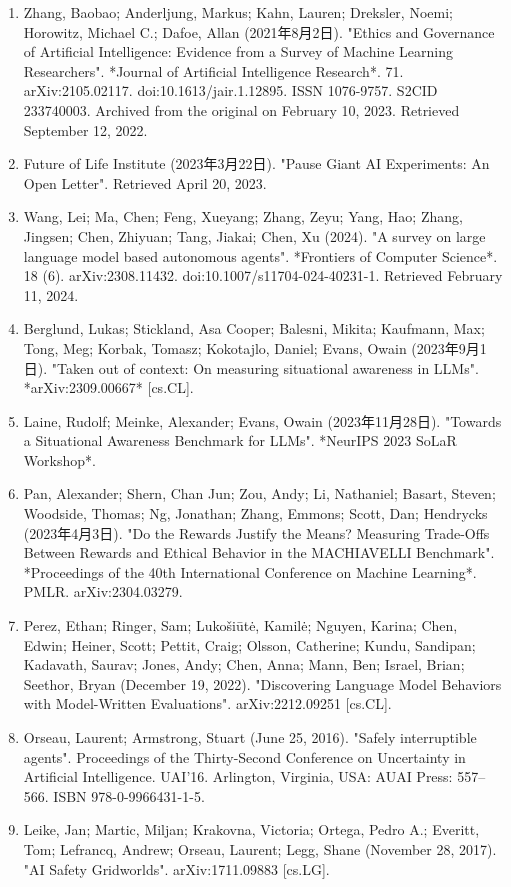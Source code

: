 \begin{enumerate}
\item Zhang, Baobao; Anderljung, Markus; Kahn, Lauren; Dreksler, Noemi; Horowitz, Michael C.; Dafoe, Allan (2021年8月2日). "Ethics and Governance of Artificial Intelligence: Evidence from a Survey of Machine Learning Researchers". *Journal of Artificial Intelligence Research*. 71. arXiv:2105.02117. doi:10.1613/jair.1.12895. ISSN 1076-9757. S2CID 233740003. Archived from the original on February 10, 2023. Retrieved September 12, 2022.
\item Future of Life Institute (2023年3月22日). "Pause Giant AI Experiments: An Open Letter". Retrieved April 20, 2023.
\item Wang, Lei; Ma, Chen; Feng, Xueyang; Zhang, Zeyu; Yang, Hao; Zhang, Jingsen; Chen, Zhiyuan; Tang, Jiakai; Chen, Xu (2024). "A survey on large language model based autonomous agents". *Frontiers of Computer Science*. 18 (6). arXiv:2308.11432. doi:10.1007/s11704-024-40231-1. Retrieved February 11, 2024.
\item Berglund, Lukas; Stickland, Asa Cooper; Balesni, Mikita; Kaufmann, Max; Tong, Meg; Korbak, Tomasz; Kokotajlo, Daniel; Evans, Owain (2023年9月1日). "Taken out of context: On measuring situational awareness in LLMs". *arXiv:2309.00667* [cs.CL].
\item Laine, Rudolf; Meinke, Alexander; Evans, Owain (2023年11月28日). "Towards a Situational Awareness Benchmark for LLMs". *NeurIPS 2023 SoLaR Workshop*.
\item Pan, Alexander; Shern, Chan Jun; Zou, Andy; Li, Nathaniel; Basart, Steven; Woodside, Thomas; Ng, Jonathan; Zhang, Emmons; Scott, Dan; Hendrycks (2023年4月3日). "Do the Rewards Justify the Means? Measuring Trade-Offs Between Rewards and Ethical Behavior in the MACHIAVELLI Benchmark". *Proceedings of the 40th International Conference on Machine Learning*. PMLR. arXiv:2304.03279.
\item Perez, Ethan; Ringer, Sam; Lukošiūtė, Kamilė; Nguyen, Karina; Chen, Edwin; Heiner, Scott; Pettit, Craig; Olsson, Catherine; Kundu, Sandipan; Kadavath, Saurav; Jones, Andy; Chen, Anna; Mann, Ben; Israel, Brian; Seethor, Bryan (December 19, 2022). "Discovering Language Model Behaviors with Model-Written Evaluations". arXiv:2212.09251 [cs.CL].
\item Orseau, Laurent; Armstrong, Stuart (June 25, 2016). "Safely interruptible agents". Proceedings of the Thirty-Second Conference on Uncertainty in Artificial Intelligence. UAI'16. Arlington, Virginia, USA: AUAI Press: 557–566. ISBN 978-0-9966431-1-5.
\item Leike, Jan; Martic, Miljan; Krakovna, Victoria; Ortega, Pedro A.; Everitt, Tom; Lefrancq, Andrew; Orseau, Laurent; Legg, Shane (November 28, 2017). "AI Safety Gridworlds". arXiv:1711.09883 [cs.LG].

\end{enumerate}
